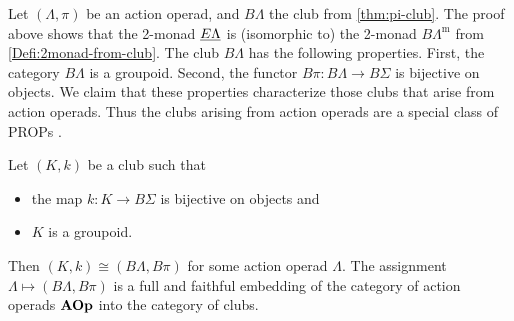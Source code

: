 Let $(\Lambda, \pi)$ be an action operad, and $B\Lambda$ the club from \cref{thm:pi-club}. The proof above shows that the 2-monad $\underline{E\Lambda}$ is (isomorphic to) the 2-monad $B\Lambda^{\textrm{m}}$ from \cref{Defi:2monad-from-club}.
The club $B\Lambda$ has the following properties. First, the category $B\Lambda$ is a groupoid. Second, the functor $B\pi \colon B\Lambda \rightarrow B\Sigma$ is  bijective on objects. We claim that these properties characterize those clubs that arise from action operads. Thus the clubs arising from action operads are a special class of PROPs \cite{mac_prop, markl_prop}.

\begin{thm}\label{thm:club=operad}
Let $(K, k)$ be a club such that
\begin{itemize}
\item the map $k \colon K \rightarrow B\Sigma$ is bijective on objects and
\item $K$ is a groupoid.
\end{itemize}
Then $(K,k) \cong (B\Lambda, B\pi)$ for some action operad $\Lambda$. The assignment $\Lambda \mapsto (B\Lambda, B\pi)$ is a full and faithful embedding of the category of action operads $\mathbf{AOp}$ into the category of clubs.
\end{thm}
